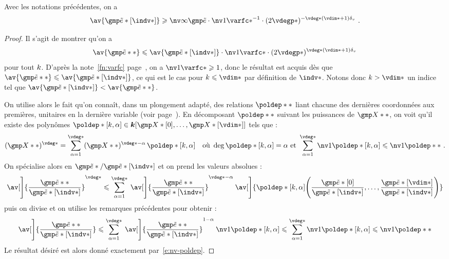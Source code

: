 \begin{lem} \label{l:coord-norm}
  Avec les notations précédentes, on a
  \begin{equation}
    \av{ \cexa*[\indv*] }
    \ge
    \nv\infty{ \cexa }
    \cdot \nv1{ \varfc* }^{-1}
    \cdot ( 2 \vdegp* )^{- \vdeg* (\vdim* + 1) \dv}
    \pmm.
  \end{equation}
\end{lem}

\begin{proof}
  Il s'agit de montrer qu'on a
  \begin{equation}
    \av{ \cexa** }
    \le
    \av{ \cexa*[\indv*] }
    \cdot \nv1{ \varfc* }
    \cdot ( 2 \vdegp* )^{\vdeg* (\vdim* + 1) \dv}
  \end{equation}
  pour tout \( k \). D'après la note~\vref{fn:varfc}
  page~\pageref{fn:varfc}, on a \( \nv1{ \varfc* } \ge 1 \), donc le résultat
  est acquis dès que \( \av{ \cexa** } \le \av{ \cexa*[\indv*] } \), ce qui est
  le cas pour \( \ind \le \vdim* \) par définition de \( \indv* \). Notons donc
  \( \ind > \vdim* \) un indice tel que \( \av{ \cexa*[\indv*] } < \av{ \cexa**
    } \).

  On utilise alors le fait qu'on connaît, dans un plongement adapté, des
  relations \( \poldep** \) liant chacune des dernières coordonnées aux
  premières,  unitaires en la dernière variable (voir
  page~\pageref{p:def-poldep}). En décomposant \( \poldep**
  \) suivant les puissances de \( \vmp** \), on voit qu'il existe des
  polynômes \( \poldep*[\ind, \alpha] \in \cdn[ \vmp*[0], \dots, \vmp*[\vdim*]
    ] \) tels que :
  \begin{equation}
    (\vmp**) ^{ \vdeg* }
    =
    \sum_{ \alpha=1 }^{ \vdeg* }
    (\vmp**) ^{ \vdeg* - \alpha }
    \, \poldep*[\ind, \alpha]
    \quad\text{où }
    \deg \poldep*[\ind, \alpha] = \alpha
    \text{ et }
    \sum_{ \alpha=1 }^{ \vdeg* } \nv1{ \poldep*[\ind, \alpha] }
    \le \nv1{ \poldep** }
    \pmm.
  \end{equation}
  On spécialise alors en \( \cexa* / \cexa*[\indv*] \) et on prend les valeurs
  absolues :
  \begin{equation}
    \av[\Bigg]{ \frac{ \cexa** }{ \cexa*[\indv*] } }^{ \vdeg* }
    \le
    \sum_{ \alpha=1 }^{ \vdeg* }
    \: \av[\Bigg]{ \frac{ \cexa** }{ \cexa*[\indv*] } }^{ \vdeg* - \alpha }
    \: \av[\Bigg]{
      \poldep*[\ind, \alpha] \Biggl(
        \frac{ \cexa*[0] }{ \cexa*[\indv*] }, \dots,
        \frac{ \cexa*[\vdim*] }{ \cexa*[\indv*] }
      \Biggr)
    }
  \end{equation}
  puis on divise et on utilise les remarques précédentes pour obtenir :
  \begin{align}
    \av[\Bigg]{ \frac{ \cexa** }{ \cexa*[\indv*] } }
    \le
    \sum_{ \alpha=1 }^{ \vdeg* }
    \: \av[\Bigg]{ \frac{ \cexa** }{ \cexa*[\indv*] } }^{ 1 - \alpha }
    \: \nv1{ \poldep*[\ind, \alpha] }
    \le
    \sum_{ \alpha=1 }^{ \vdeg* }
    \nv1{ \poldep*[\ind, \alpha] }
    \le
    \nv1{ \poldep** }
  \end{align}
  Le résultat désiré est alors donné exactement par~\eqref{e:nv-poldep}.
\end{proof}

